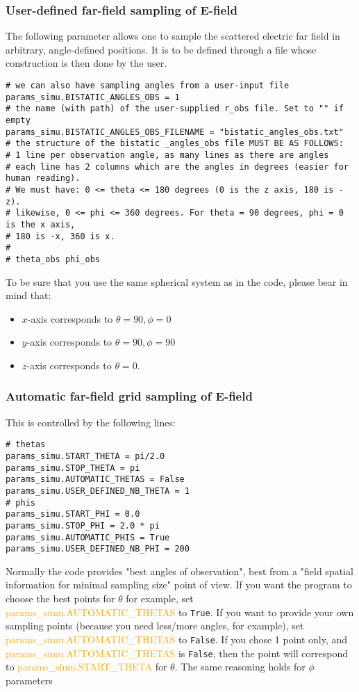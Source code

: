 \documentclass[a4paper,10pt]{book}
\newcommand{\parameter}[1] {\textcolor{orange}{\textsf{#1}}}
\begin{document}
\subsubsection{User-defined far-field sampling of E-field}
%
\par
The following parameter allows one to sample the scattered electric far field in arbitrary, angle-defined positions. It is to be defined through a file whose construction is then done by the user.
\begin{verbatim}
# we can also have sampling angles from a user-input file
params_simu.BISTATIC_ANGLES_OBS = 1
# the name (with path) of the user-supplied r_obs file. Set to "" if empty
params_simu.BISTATIC_ANGLES_OBS_FILENAME = "bistatic_angles_obs.txt"
# the structure of the bistatic _angles_obs file MUST BE AS FOLLOWS:
# 1 line per observation angle, as many lines as there are angles
# each line has 2 columns which are the angles in degrees (easier for human reading).
# We must have: 0 <= theta <= 180 degrees (0 is the z axis, 180 is -z).
# likewise, 0 <= phi <= 360 degrees. For theta = 90 degrees, phi = 0 is the x axis, 
# 180 is -x, 360 is x.
#
# theta_obs phi_obs
\end{verbatim}
%
\par
To be sure that you use the same spherical system as in the code, please bear in mind that:
\begin{itemize}
\item $x$-axis corresponds to $\theta = 90, \phi = 0$
\item $y$-axis corresponds to $\theta = 90, \phi = 90$
\item $z$-axis corresponds to $\theta = 0$.
\end{itemize}

\subsubsection{Automatic far-field grid sampling of E-field}
%
\par
This is controlled by the following lines:
\begin{verbatim}
# thetas
params_simu.START_THETA = pi/2.0
params_simu.STOP_THETA = pi
params_simu.AUTOMATIC_THETAS = False
params_simu.USER_DEFINED_NB_THETA = 1
# phis
params_simu.START_PHI = 0.0
params_simu.STOP_PHI = 2.0 * pi
params_simu.AUTOMATIC_PHIS = True
params_simu.USER_DEFINED_NB_PHI = 200
\end{verbatim}
%
\par
Normally the code provides "best angles of observation", best from a "field spatial information for minimal sampling size" point of view. If you want the program to choose the best points for $\theta$ for example, set \parameter{params\_simu.AUTOMATIC\_THETAS} to \texttt{True}. If you want to provide your own sampling points (because you need less/more angles, for example), set \parameter{params\_simu.AUTOMATIC\_THETAS} to \texttt{False}. If you chose 1 point only, and \parameter{params\_simu.AUTOMATIC\_THETAS} is \texttt{False}, then the point will correspond to \parameter{params\_simu.START\_THETA} for $\theta$. The same reasoning holds for $\phi$ parameters
\end{document}
